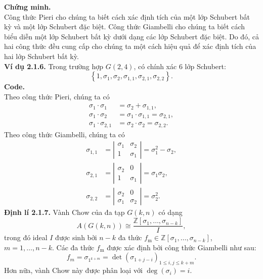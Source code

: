 \documentclass[11pt,a4paper]{book}
\begin{document}
\textbf{Chứng minh.}\\
Công thức Pieri cho chúng ta biết cách xác định tích của một lớp Schubert bất kỳ và một lớp Schubert đặc biệt. Công thức Giambelli cho chúng ta biết cách biểu diễn một lớp Schubert bất kỳ dưới dạng các lớp Schubert đặc biệt. Do đó, cả hai công thức đều cung cấp cho chúng ta một cách hiệu quả để xác định tích của hai lớp Schubert bất kỳ.\\
\textbf{Ví dụ 2.1.6.}
Trong trường hợp \( G(2,4) \), có chính xác 6 lớp Schubert:
$$
\left\{1, \sigma_1, \sigma_2, \sigma_{1,1}, \sigma_{2,1}, \sigma_{2,2}\right\}.$$
\textbf{Code.}\\
Theo công thức Pieri, chúng ta có
\[
\begin{aligned}
	\sigma_1 \cdot \sigma_1 &=\sigma_2+\sigma_{1,1}, \\
	\sigma_1 \cdot \sigma_2 &=\sigma_1 \cdot \sigma_{1,1}=\sigma_{2,1}, \\
	\sigma_1 \cdot \sigma_{2,1} &=\sigma_2 \cdot \sigma_2=\sigma_{2,2}.
\end{aligned}
\]
Theo công thức Giambelli, chúng ta có
\[
\begin{aligned}
	\sigma_{1,1}&=\left|\begin{array}{cc}
		\sigma_1 & \sigma_2 \\
		1 & \sigma_1
	\end{array}\right|=\sigma_1^2-\sigma_2, \\
	\sigma_{2,1}&=\left|\begin{array}{cc}
		\sigma_2 & 0 \\
		1 & \sigma_1
	\end{array}\right|=\sigma_1 \sigma_2, \\
	\sigma_{2,2}&=\left|\begin{array}{ll}
		\sigma_2 & 0 \\
		\sigma_1 & \sigma_2
	\end{array}\right|=\sigma_2^2.
\end{aligned}
\]
\textbf{Định lí 2.1.7.} Vành Chow của đa tạp \( G(k, n) \) có dạng
\[
A(G(k, n)) \cong \frac{\mathbb{Z}\left[\sigma_1, \ldots, \sigma_{n-k}\right]}{I},
\]
trong đó ideal \( I \) được sinh bởi \( n-k \) đa thức \( f_{\mathrm{m}} \in \mathbb{Z}\left[\sigma_1, \ldots, \sigma_{n-k}\right] \), \( m=1, \ldots, n-k \). Các đa thức \( f_{\mathrm{m}} \) được xác định bởi công thức Giambelli như sau:
\[
f_m=\sigma_{1^{k+m}}=\operatorname{det}\left(\sigma_{1+j-i}\right)_{1 \leq i, j \leq k+m}.
\]
Hơn nữa, vành Chow này được phân loại với \( \operatorname{deg}\left(\sigma_i\right)=i \).\\
\end{document}
